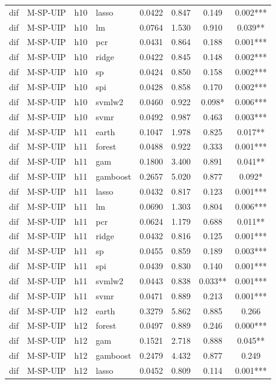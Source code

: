 \begin{ThreePartTable}
\begin{longtable}[t]{llclcccc}
dif & M-SP-UIP & h10 & lasso & 0.0422 & 0.847 & 0.149 & 0.002***\\
dif & M-SP-UIP & h10 & lm & 0.0764 & 1.530 & 0.910 & 0.039**\\
dif & M-SP-UIP & h10 & pcr & 0.0431 & 0.864 & 0.188 & 0.001***\\
dif & M-SP-UIP & h10 & ridge & 0.0422 & 0.845 & 0.148 & 0.002***\\
dif & M-SP-UIP & h10 & sp & 0.0424 & 0.850 & 0.158 & 0.002***\\
dif & M-SP-UIP & h10 & spi & 0.0428 & 0.858 & 0.170 & 0.002***\\
dif & M-SP-UIP & h10 & svmlw2 & 0.0460 & 0.922 & 0.098* & 0.006***\\
dif & M-SP-UIP & h10 & svmr & 0.0492 & 0.987 & 0.463 & 0.003***\\
\addlinespace
dif & M-SP-UIP & h11 & earth & 0.1047 & 1.978 & 0.825 & 0.017**\\
dif & M-SP-UIP & h11 & forest & 0.0488 & 0.922 & 0.333 & 0.001***\\
dif & M-SP-UIP & h11 & gam & 0.1800 & 3.400 & 0.891 & 0.041**\\
dif & M-SP-UIP & h11 & gamboost & 0.2657 & 5.020 & 0.877 & 0.092*\\
dif & M-SP-UIP & h11 & lasso & 0.0432 & 0.817 & 0.123 & 0.001***\\
dif & M-SP-UIP & h11 & lm & 0.0690 & 1.303 & 0.804 & 0.006***\\
dif & M-SP-UIP & h11 & pcr & 0.0624 & 1.179 & 0.688 & 0.011**\\
dif & M-SP-UIP & h11 & ridge & 0.0432 & 0.816 & 0.125 & 0.001***\\
dif & M-SP-UIP & h11 & sp & 0.0455 & 0.859 & 0.189 & 0.003***\\
dif & M-SP-UIP & h11 & spi & 0.0439 & 0.830 & 0.140 & 0.001***\\
dif & M-SP-UIP & h11 & svmlw2 & 0.0443 & 0.838 & 0.033** & 0.001***\\
dif & M-SP-UIP & h11 & svmr & 0.0471 & 0.889 & 0.213 & 0.001***\\
\addlinespace
dif & M-SP-UIP & h12 & earth & 0.3279 & 5.862 & 0.885 & 0.266\\
dif & M-SP-UIP & h12 & forest & 0.0497 & 0.889 & 0.246 & 0.000***\\
dif & M-SP-UIP & h12 & gam & 0.1521 & 2.718 & 0.888 & 0.045**\\
dif & M-SP-UIP & h12 & gamboost & 0.2479 & 4.432 & 0.877 & 0.249\\
dif & M-SP-UIP & h12 & lasso & 0.0452 & 0.809 & 0.114 & 0.001***\\

\end{longtable}
\end{ThreePartTable}
